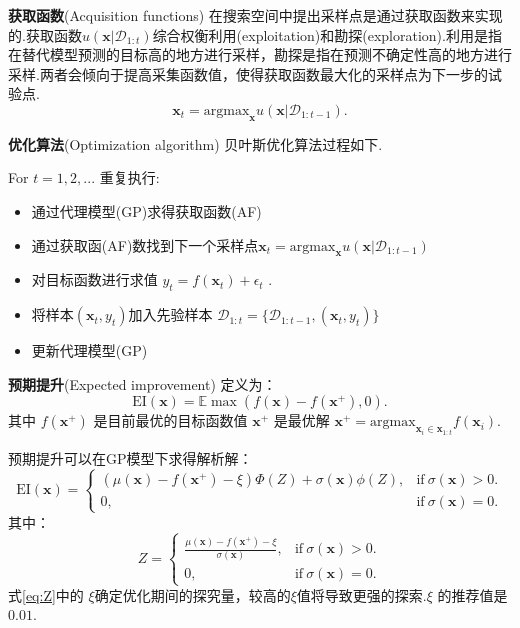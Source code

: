 \documentclass{whutmod}
\begin{document}
	\textbf{获取函数}(Acquisition functions)
	在搜索空间中提出采样点是通过获取函数来实现的.获取函数$u(\mathbf{x} \lvert \mathcal{D}_{1:t})$综合权衡利用(exploitation)和勘探(exploration).利用是指在替代模型预测的目标高的地方进行采样，勘探是指在预测不确定性高的地方进行采样.两者会倾向于提高采集函数值，使得获取函数最大化的采样点为下一步的试验点.
	\begin{equation}
		\mathbf{x}_t = \mathrm{argmax}_{\mathbf{x}} u(\mathbf{x} \lvert \mathcal{D}_{1:t-1}).
	\end{equation}

	\textbf{优化算法}(Optimization algorithm)
	贝叶斯优化算法过程如下.

	For $t = 1,2,...$ 重复执行:

	\begin{itemize}
	\item 通过代理模型(GP)求得获取函数(AF)
	\item  通过获取函(AF)数找到下一个采样点$\mathbf{x}_t = \mathrm{argmax}_{\mathbf{x}} u(\mathbf{x} \lvert \mathcal{D}_{1:t-1})$
	\item 对目标函数进行求值 $y_t = f(\mathbf{x}_t) + \epsilon_t$ .
	\item 将样本$(\mathbf{x}_t,y_t)$加入先验样本 $\mathcal{D}_{1:t} = \{\mathcal{D}_{1:t-1}, (\mathbf{x}_t,y_t)\}$ 
	\item 更新代理模型(GP)
	\end{itemize}

	\textbf{预期提升}(Expected improvement)
	定义为：
	\begin{equation}
		\mathrm{EI}(\mathbf{x}) = \mathbb{E}\max(f(\mathbf{x}) - f(\mathbf{x}^+), 0).
	\end{equation}
	其中 $f(\mathbf{x}^+)$ 是目前最优的目标函数值 $\mathbf{x}^+$ 是最优解 $\mathbf{x}^+ = \mathrm{argmax}_{\mathbf{x}_i \in \mathbf{x}_{1:t}} f(\mathbf{x}_i)$. 

	预期提升可以在GP模型下求得解析解：
	\begin{equation}
		\mathrm{EI}(\mathbf{x}) =
		\begin{cases}
		(\mu(\mathbf{x}) - f(\mathbf{x}^+) - \xi)\Phi(Z) + \sigma(\mathbf{x})\phi(Z), &\text{if}\ \sigma(\mathbf{x}) > 0. \\
		0,& \text{if}\ \sigma(\mathbf{x}) = 0.
		\end{cases}
	\end{equation}
	其中：
	\begin{equation}
		Z =
		\begin{cases}
		\frac{\mu(\mathbf{x}) - f(\mathbf{x}^+) - \xi}{\sigma(\mathbf{x})}, &\text{if}\ \sigma(\mathbf{x}) > 0. \\
		0, & \text{if}\ \sigma(\mathbf{x}) = 0.
		\end{cases}
		\label{eq:Z}
	\end{equation}
	式\ref{eq:Z}中的 $\xi$确定优化期间的探究量，较高的$\xi$值将导致更强的探索.$\xi$ 的推荐值是 $0.01$.
\end{document}
